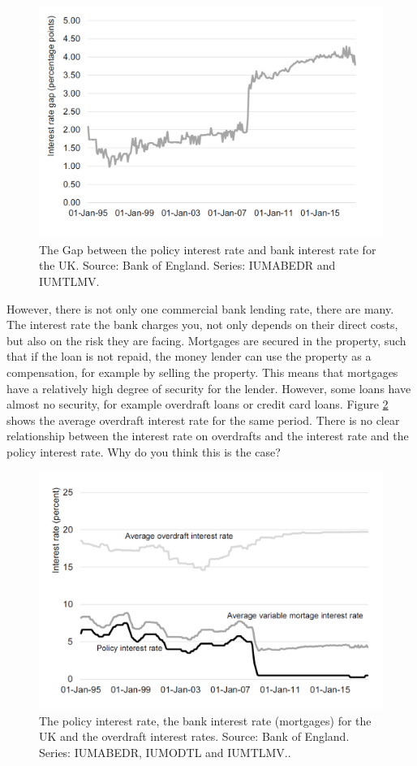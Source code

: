 \documentclass[]{book}
\begin{document}
\begin{figure}

{\centering \includegraphics[width=0.7\linewidth]{_resources/chapter_money/ex4_3} 

}

\caption{The Gap between the policy interest rate and bank interest rate for the UK. Source: Bank of England. Series: IUMABEDR and IUMTLMV.}\label{fig:money2}
\end{figure}

However, there is not only one commercial bank lending rate, there are many. The interest rate the bank charges you, not only depends on their direct costs, but also on the risk they are facing. Mortgages are secured in the property, such that if the loan is not repaid, the money lender can use the property as a compensation, for example by selling the property. This means that mortgages have a relatively high degree of security for the lender. However, some loans have almost no security, for example overdraft loans or credit card loans.
Figure \ref{fig:money3} shows the average overdraft interest rate for the same period. There is no clear relationship between the interest rate on overdrafts and the interest rate and the policy interest rate. Why do you think this is the case?

\begin{figure}

{\centering \includegraphics[width=0.7\linewidth]{_resources/chapter_money/ex4_1} 

}

\caption{The policy interest rate, the  bank interest rate (mortgages) for the UK and the overdraft interest rates. Source: Bank of England. Series: IUMABEDR, IUMODTL and IUMTLMV..}\label{fig:money3}
\end{figure}
\end{document}
